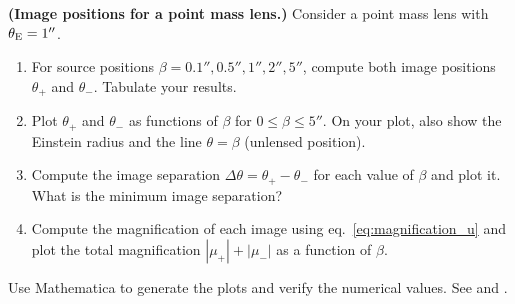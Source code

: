 \begin{exercise}
\label{ex:image_positions_plot}
\textbf{(Image positions for a point mass lens.)}
Consider a point mass lens with $\theta_{\mathrm{E}} = 1''$.
\begin{enumerate}[label=(\alph*)]
    \item For source positions $\beta = 0.1'', 0.5'', 1'', 2'', 5''$,
          compute both image positions $\theta_+$ and $\theta_-$.
          Tabulate your results.
    \item Plot $\theta_+$ and $\theta_-$ as functions of $\beta$ for
          $0 \leq \beta \leq 5''$.  On your plot, also show the
          Einstein radius and the line $\theta = \beta$ (unlensed
          position).
    \item Compute the image separation $\Delta\theta = \theta_+ - \theta_-$
          for each value of $\beta$ and plot it.  What is the minimum
          image separation?
    \item Compute the magnification of each image using
          eq.~\eqref{eq:magnification_u} and plot the total
          magnification $|\mu_+| + |\mu_-|$ as a function of $\beta$.
\end{enumerate}
Use Mathematica to generate the plots and verify the numerical values.
See 
and .
\end{exercise}
